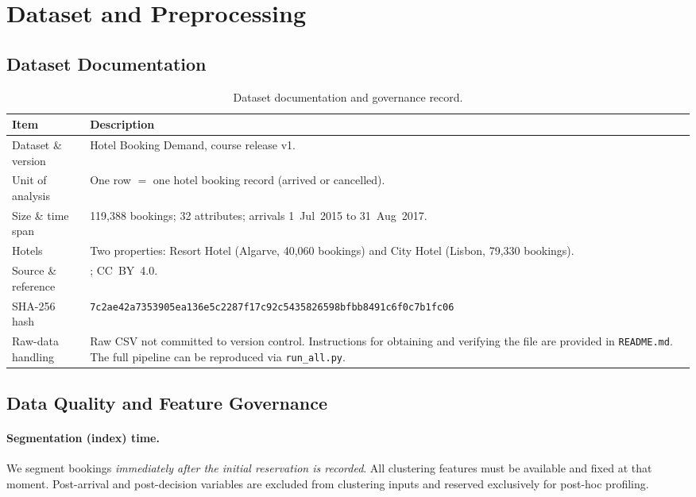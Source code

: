\documentclass[12pt,a4paper]{article}
\begin{document}
\section{Dataset and Preprocessing}
\label{sec:data}

\subsection{Dataset Documentation}
\label{sec:dataset_doc}

\begin{table}[H]
  \centering
  \caption{Dataset documentation and governance record.}
  \label{tab:dataset}
  \small
  \begin{tabularx}{\textwidth}{@{}L{3.5cm}X@{}}
    \toprule
    \textbf{Item} & \textbf{Description} \\
    \midrule
    Dataset \& version
      & Hotel Booking Demand, course release v1. \\
    Unit of analysis
      & One row $=$ one hotel booking record (arrived or cancelled). \\
    Size \& time span
      & 119,388 bookings; 32 attributes; arrivals 1~Jul~2015 to 31~Aug~2017. \\
    Hotels
      & Two properties: Resort Hotel (Algarve, 40,060 bookings) and
        City Hotel (Lisbon, 79,330 bookings). \\
    Source \& reference
      & \citet{antonio2019}; CC~BY~4.0. \\
    SHA-256 hash
      & \texttt{7c2ae42a7353905ea136e5c2287f17c92c5435826598bfbb8491c6f0c7b1fc06} \\
    Raw-data handling
      & Raw CSV not committed to version control. Instructions for
        obtaining and verifying the file are provided in
        \texttt{README.md}. The full pipeline can be reproduced via \texttt{run\_all.py}. \\
    \bottomrule
  \end{tabularx}
\end{table}

\subsection{Data Quality and Feature Governance}
\label{sec:governance}

\paragraph{Segmentation (index) time.}
We segment bookings \emph{immediately after the initial reservation is
recorded}.
All clustering features must be available and fixed at that moment.
Post-arrival and post-decision variables are excluded from clustering inputs
and reserved exclusively for post-hoc profiling.
\end{document}

